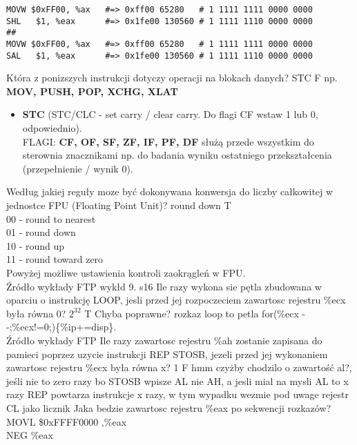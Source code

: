 \begin{lstlisting}
MOVW $0xFF00, %ax   #=> 0xff00 65280   # 1 1111 1111 0000 0000
SHL   $1, %eax      #=> 0x1fe00 130560 # 1 1111 1110 0000 0000
##
MOVW $0xFF00, %ax   #=> 0xff00 65280   # 1 1111 1111 0000 0000
SAL   $1, %eax      #=> 0x1fe00 130560 # 1 1111 1110 0000 0000

\end{lstlisting}
\answer
{Która z ponizszych instrukcji dotyczy operacji na blokach danych?}
{STC}
{F}
{np. \textbf{MOV, PUSH, POP, XCHG, XLAT}}
{\begin{itemize}
\item[] \textbf{STC} (STC/CLC - set carry / clear carry. Do flagi CF wstaw 1 lub 0, odpowiednio). \\FLAGI: \textbf{CF, OF, SF, ZF, IF, PF, DF} służą przede wszystkim do sterownia znacznikami np. do badania wyniku ostatniego przekształcenia (przepełnienie / wynik 0).
\end{itemize}}
\answer
{Według jakiej reguły moze być dokonywana konwersja do liczby całkowitej w jednostce FPU (Floating Point Unit)?
}
{round down}
{T}
{\\
	00 - round to nearest\\
	01 - round down\\
	10 - round up\\
	11 - round toward zero\\}
{Powyżej możliwe ustawienia kontroli zaokrągleń w FPU. \\Źródło wykłady FTP wykłd 9. s16}
\answer
{Ile razy wykona sie pętla zbudowana w oparciu o instrukcję LOOP, jesli przed jej rozpoczeciem zawartosc rejestru \%ecx była równa 0? }
{$2^{32}$}
{T}
{Chyba poprawne?}
{rozkaz loop to petla for(\%ecx - -;\%ecx!=0;)\{\%ip+=disp\}. \\Źródło wykłady FTP}
\answer
{Ile razy zawartosc rejestru \%ah zostanie zapisana do pamieci poprzez uzycie instrukcji REP STOSB, jezeli przed jej wykonaniem zawartosc rejestru \%ecx była równa x?}
{1}
{F}
{hmm czyżby chodzilo o zawartość al?, jeśli nie to zero razy bo STOSB wpisze AL nie AH, a jesli mial na mysli AL to x razy}
{REP powtarza instrukcje x razy, w tym wypadku wezmie pod uwage rejestr CL jako licznik}
\answer
{
	Jaka bedzie zawartosc rejestru \%eax po sekwencji rozkazów?\\
	MOVL \$0xFFFF0000 ,\%eax\\
	NEG \%eax
}
